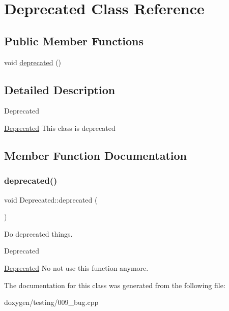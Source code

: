 \hypertarget{class_deprecated}{}\section{Deprecated Class Reference}
\label{class_deprecated}
\subsection*{Public Member Functions}
\begin{DoxyCompactItemize}
\item 
void \mbox{\hyperlink{class_deprecated_a1d5f6803e72c625727e7083d1722dbf9}{deprecated}} ()
\end{DoxyCompactItemize}


\subsection{Detailed Description}
\begin{DoxyRefDesc}{Deprecated}
\item[\mbox{\hyperlink{deprecated__deprecated000001}{Deprecated}}]This class is deprecated \end{DoxyRefDesc}


\subsection{Member Function Documentation}
\mbox{\label{class_deprecated_a1d5f6803e72c625727e7083d1722dbf9}} 
\subsubsection{\texorpdfstring{deprecated()}{deprecated()}}
{\footnotesize\ttfamily void Deprecated\+::deprecated (\begin{DoxyParamCaption}{ }\end{DoxyParamCaption})}

Do deprecated things. \begin{DoxyRefDesc}{Deprecated}
\item[\mbox{\hyperlink{deprecated__deprecated000002}{Deprecated}}]No not use this function anymore. \end{DoxyRefDesc}


The documentation for this class was generated from the following file\+:\begin{DoxyCompactItemize}
\item 
doxygen/testing/009\+\_\+bug.\+cpp\end{DoxyCompactItemize}
